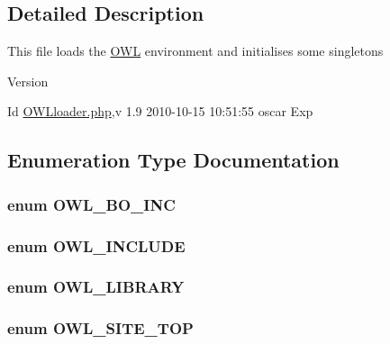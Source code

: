 \subsection{Detailed Description}
This file loads the \hyperlink{classOWL}{OWL} environment and initialises some singletons \begin{DoxyVersion}{Version}

\end{DoxyVersion}
\begin{DoxyParagraph}{Id}
\hyperlink{OWLloader_8php}{OWLloader.php},v 1.9 2010-\/10-\/15 10:51:55 oscar Exp 
\end{DoxyParagraph}


\subsection{Enumeration Type Documentation}
\subsubsection[{OWL\_\-BO\_\-INC}]{\setlength{\rightskip}{0pt plus 5cm}enum {\bf OWL\_\-BO\_\-INC}}\label{OWLloader_8php_aca50646bc73c3addf0e0f25081eae0ae}
\subsubsection[{OWL\_\-INCLUDE}]{\setlength{\rightskip}{0pt plus 5cm}enum {\bf OWL\_\-INCLUDE}}\label{OWLloader_8php_a4d33a8f2fcc9c83cbeea921c4cb23a7f}
\subsubsection[{OWL\_\-LIBRARY}]{\setlength{\rightskip}{0pt plus 5cm}enum {\bf OWL\_\-LIBRARY}}\label{OWLloader_8php_a74eed08508c8b70677c4167acf49e427}
\subsubsection[{OWL\_\-SITE\_\-TOP}]{\setlength{\rightskip}{0pt plus 5cm}enum {\bf OWL\_\-SITE\_\-TOP}}\label{OWLloader_8php_a462de9ae02e394313337afac5d1a5f95}
